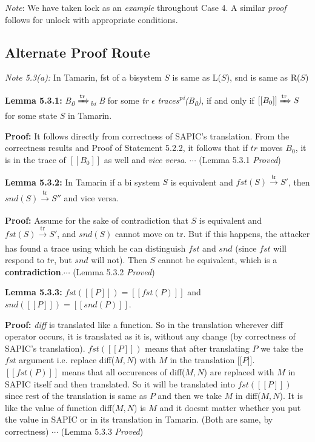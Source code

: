 \documentclass[11pt]{article}
\begin{document}
{\it Note}: We have taken lock as an {\it example} throughout Case 4. A similar {\it proof} follows for unlock with appropriate conditions.
\subsection{Alternate Proof Route} 
{\it Note 5.3(a): }In Tamarin, fst of a bisystem $S$ is same as L($S$), snd is same as R($S$)\newline

{\bf Lemma 5.3.1: }{\it B\textsubscript{0} {$\xRightarrow[\text{}]{\text{tr}}$}\textsubscript{bi} B} for some {\it tr $\epsilon$ traces\textsuperscript{pi}(B\textsubscript{0})}, if and only if $[[B_0]]\xRightarrow[\text{}]{\text{tr}}S$ for some state $S$ in Tamarin.\newline

{\bf Proof: }It follows directly from correctness of SAPIC's translation. From the correctness results and Proof of Statement 5.2.2, it follows that if $tr$ moves $B_0$, it is in the trace of $[[B_0]]$ as well and {\it vice versa}. \hfill \hfill $\cdots$ (Lemma 5.3.1 {\it Proved}) \newline

{\bf Lemma 5.3.2: }In Tamarin if a bi system $S$ is equivalent and $fst(S) \xrightarrow[\text{}]{\text{tr}} S'$, then $snd(S) \xrightarrow[\text{}]{\text{tr}} S''$ and vice versa.\newline

{\bf Proof: }Assume for the sake of contradiction that $S$ is equivalent and $fst(S) \xrightarrow[\text{}]{\text{tr}} S'$, and $snd(S)$ cannot move on tr. But if this happens, the attacker has found a trace using which he can distinguish $fst$ and $snd$ (since $fst$ will respond to $tr$, but $snd$ will not). Then $S$ cannot be equivalent, which is a {\bf contradiction}.\hfill \hfill $\cdots$ (Lemma 5.3.2 {\it Proved})\newline 

{\bf Lemma 5.3.3: }$fst([[P]])=[[fst(P)]]$ and $snd([[P]])=[[snd(P)]]$. \newline

{\bf Proof:} {\it diff} is translated like a function. So in the translation wherever diff operator occurs, it is translated as it is, without any change (by correctness of SAPIC's translation). $fst([[P]])$ means that after translating $P$ we take the $fst$ argument i.e. replace diff($M, N$) with $M$ in the translation [[$P$]]. $[[fst(P)]]$ means that all occurences of diff($M, N$) are replaced with $M$ in SAPIC itself and then translated. So it will be translated into $fst([[P]])$ since rest of the translation is same as $P$ and then we take $M$ in diff($M, N$). It is like the value of function diff($M, N$) is $M$ and it doesnt matter whether you put the value in SAPIC or in its translation in Tamarin. (Both are same, by correctness) \hfill \hfill $\cdots$ (Lemma 5.3.3 {\it Proved})\newline 
\end{document}
